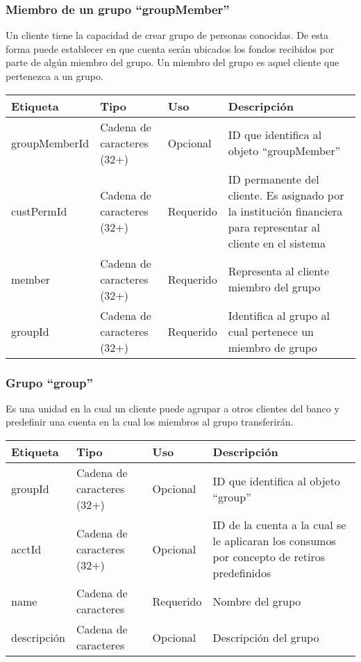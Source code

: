 \subsubsection{Miembro de un grupo ``groupMember''}
Un cliente tiene la capacidad de crear grupo de personas conocidas. De esta forma puede establecer en que cuenta serán ubicados los fondos recibidos por parte de algún miembro del grupo. Un miembro del grupo es aquel cliente que pertenezca a un grupo.

\begin{center}
\begin{longtable}{|>{\centering\arraybackslash}p{}|>{\centering\arraybackslash}p{}|>{\centering\arraybackslash}p{}|>{\centering\arraybackslash}p{}|}
\hline 
\bfseries {Etiqueta} & \bfseries {Tipo} & \bfseries {Uso} & \bfseries {Descripción} \\ 
\hline 
groupMemberId & Cadena de caracteres (32+) & Opcional & ID que identifica al objeto ``groupMember'' \\ 
\hline 
custPermId & Cadena de caracteres (32+) & Requerido & ID permanente del cliente. Es asignado por la institución financiera para representar al cliente en el sistema \\
\hline 
member & Cadena de caracteres (32+) & Requerido & Representa al cliente miembro del grupo \\
\hline 
groupId & Cadena de caracteres (32+) & Requerido & Identifica al grupo al cual pertenece un miembro de grupo\\
\hline 
\end{longtable}
\end{center}

\subsubsection{Grupo ``group''}
Es una unidad en la cual un cliente puede agrupar a otros clientes del banco y
predefinir una cuenta en la cual los miembros al grupo transferirán.

\begin{center}
\begin{longtable}{|>{\centering\arraybackslash}p{}|>{\centering\arraybackslash}p{}|>{\centering\arraybackslash}p{}|>{\centering\arraybackslash}p{}|}
\hline 
\bfseries {Etiqueta} & \bfseries {Tipo} & \bfseries {Uso} & \bfseries {Descripción} \\ 
\hline 
groupId & Cadena de caracteres (32+) & Opcional & ID que identifica al objeto ``group'' \\ 
\hline
acctId & Cadena de caracteres (32+) & Opcional & ID de la cuenta a la cual se le aplicaran los consumos por concepto de retiros predefinidos \\ 
\hline 
name & Cadena de caracteres & Requerido & Nombre del grupo \\
\hline 
descripción & Cadena de caracteres & Opcional & Descripción del grupo \\
\hline 
\end{longtable}
\end{center}

